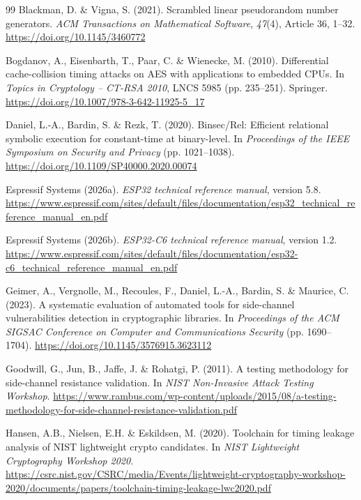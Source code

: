 \documentclass[11pt, a4paper, twoside, reqno]{article}
\begin{document}
\begin{thebibliography}{99}
Blackman, D. \& Vigna, S. (2021). Scrambled linear pseudorandom number generators. \emph{ACM Transactions on Mathematical Software}, \emph{47}(4), Article 36, 1--32. \url{https://doi.org/10.1145/3460772}

Bogdanov, A., Eisenbarth, T., Paar, C. \& Wienecke, M. (2010). Differential cache-collision timing attacks on AES with applications to embedded CPUs. In \emph{Topics in Cryptology -- CT-RSA 2010}, LNCS 5985 (pp. 235--251). Springer. \url{https://doi.org/10.1007/978-3-642-11925-5_17}

Daniel, L.-A., Bardin, S. \& Rezk, T. (2020). Binsec/Rel: Efficient relational symbolic execution for constant-time at binary-level. In \emph{Proceedings of the IEEE Symposium on Security and Privacy} (pp. 1021--1038). \url{https://doi.org/10.1109/SP40000.2020.00074}

Espressif Systems (2026a). \emph{ESP32 technical reference manual}, version 5.8. \url{https://www.espressif.com/sites/default/files/documentation/esp32_technical_reference_manual_en.pdf}

Espressif Systems (2026b). \emph{ESP32-C6 technical reference manual}, version 1.2. \url{https://www.espressif.com/sites/default/files/documentation/esp32-c6_technical_reference_manual_en.pdf}

Geimer, A., Vergnolle, M., Recoules, F., Daniel, L.-A., Bardin, S. \& Maurice, C. (2023). A systematic evaluation of automated tools for side-channel vulnerabilities detection in cryptographic libraries. In \emph{Proceedings of the ACM SIGSAC Conference on Computer and Communications Security} (pp. 1690--1704). \url{https://doi.org/10.1145/3576915.3623112}

Goodwill, G., Jun, B., Jaffe, J. \& Rohatgi, P. (2011). A testing methodology for side-channel resistance validation. In \emph{NIST Non-Invasive Attack Testing Workshop}. \url{https://www.rambus.com/wp-content/uploads/2015/08/a-testing-methodology-for-side-channel-resistance-validation.pdf}

Hansen, A.B., Nielsen, E.H. \& Eskildsen, M. (2020). Toolchain for timing leakage analysis of NIST lightweight crypto candidates. In \emph{NIST Lightweight Cryptography Workshop 2020}. \url{https://csrc.nist.gov/CSRC/media/Events/lightweight-cryptography-workshop-2020/documents/papers/toolchain-timing-leakage-lwc2020.pdf}


\end{thebibliography}
\end{document}
